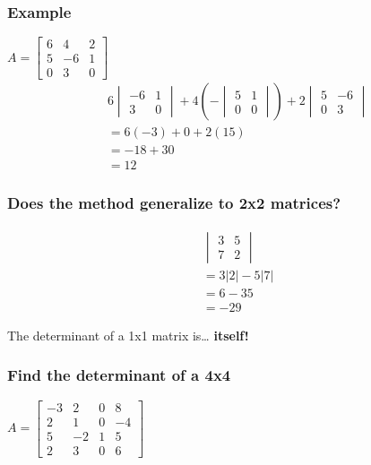 \documentclass[
  letterpaper,
  DIV=11,
  numbers=noendperiod]{scrartcl}
\begin{document}
\subsubsection{Example}\label{example-1}

\(A = \begin{bmatrix} 6 & 4 & 2 \\ 5 & -6 & 1 \\ 0 & 3 & 0\end{bmatrix}\)
\begin{align*}
& 6\begin{vmatrix}-6 & 1 \\ 3 & 0\end{vmatrix}+4\left(-\begin{vmatrix}5&1 \\ 0 & 0\end{vmatrix}\right)+2\begin{vmatrix}5 & -6 \\ 0 & 3\end{vmatrix} \\
&= 6(-3) + 0 + 2(15) \\
&= -18 + 30 \\
&= 12
\end{align*}

\subsubsection{Does the method generalize to 2x2
matrices?}\label{does-the-method-generalize-to-2x2-matrices}

\begin{align*}
&\begin{vmatrix}3 & 5 \\ 7 & 2\end{vmatrix} \\
&=3|2|-5|7| \\
&=6-35 \\
&=-29
\end{align*}

The determinant of a 1x1 matrix is\ldots{} \textbf{itself!}

\subsubsection{Find the determinant of a
4x4}\label{find-the-determinant-of-a-4x4}

\(A=\begin{bmatrix}-3 & 2 & 0 & 8 \\ 2 & 1 & 0 & -4 \\ 5 & -2 & 1 & 5 \\ 2 & 3 & 0 & 6\end{bmatrix}\)
\end{document}
